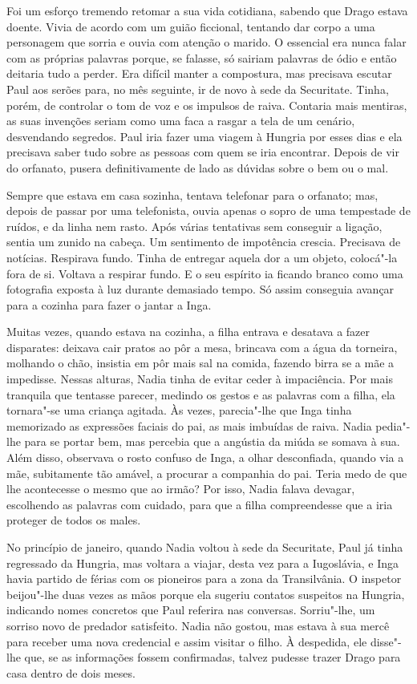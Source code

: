 Foi um esforço tremendo retomar a sua vida cotidiana, sabendo que Drago estava doente. Vivia de acordo com um guião
ficcional, tentando dar corpo a uma personagem que sorria e ouvia com
atenção o marido. O essencial era nunca falar com as próprias palavras
porque, se falasse, só sairiam palavras de ódio e então deitaria tudo a
perder. Era difícil manter a compostura, mas precisava escutar Paul
aos serões para, no mês seguinte, ir de novo à sede da Securitate.
Tinha, porém, de controlar o tom de voz e os impulsos de raiva. Contaria
mais mentiras, as suas invenções seriam como uma faca a rasgar a tela de
um cenário, desvendando segredos. Paul iria fazer uma viagem à Hungria
por esses dias e ela precisava saber tudo sobre as pessoas com quem
se iria encontrar. Depois de vir do orfanato, pusera definitivamente de
lado as dúvidas sobre o bem ou o mal.

\bigskip

Sempre que estava em casa sozinha, tentava telefonar para o orfanato;
mas, depois de passar por uma telefonista, ouvia apenas o sopro de uma
tempestade de ruídos, e da linha nem rasto. Após várias tentativas sem %
conseguir
a ligação, sentia um zunido na cabeça. Um sentimento de impotência
crescia. Precisava de notícias. Respirava fundo. Tinha de entregar
aquela dor a um objeto, colocá"-la fora de si. Voltava a respirar fundo.
E o seu espírito ia ficando branco como uma fotografia exposta à luz
durante demasiado tempo. Só assim conseguia avançar para a cozinha
para fazer o jantar a Inga.

Muitas vezes, quando estava na cozinha, a filha entrava e desatava a
fazer disparates: deixava cair pratos ao pôr a mesa, brincava com a água
da torneira, molhando o chão, insistia em pôr mais sal na comida,
fazendo birra se a mãe a impedisse. Nessas alturas, Nadia tinha de
evitar ceder à impaciência. Por mais tranquila que tentasse parecer,
medindo os gestos e as palavras com a filha, ela tornara"-se uma criança
agitada. Às vezes, parecia"-lhe que Inga tinha memorizado as expressões
faciais do pai, as mais imbuídas de raiva. Nadia pedia"-lhe para se
portar bem, mas percebia que a angústia da miúda se somava à sua. Além
disso, observava o rosto confuso de Inga, a olhar desconfiada, quando
via a mãe, subitamente tão amável, a procurar a companhia do pai. Teria
medo de que lhe acontecesse o mesmo que ao irmão? Por isso, Nadia falava
devagar, escolhendo as palavras com cuidado, para que a filha
compreendesse que a iria proteger de todos os males.

No princípio de janeiro, quando Nadia voltou à sede
da Securitate, Paul já tinha regressado da Hungria, mas voltara a
viajar, desta vez para a Iugoslávia, e Inga havia partido de férias com
os pioneiros para a zona da Transilvânia. O inspetor beijou"-lhe duas
vezes as mãos porque ela sugeriu contatos suspeitos na Hungria,
indicando
nomes concretos que Paul referira nas conversas. Sorriu"-lhe, um sorriso novo de predador satisfeito. Nadia não gostou, mas
estava à sua mercê para receber uma nova credencial e assim visitar o
filho. À despedida, ele disse"-lhe que, se as informações fossem
confirmadas, talvez pudesse trazer Drago para casa dentro de dois meses.

